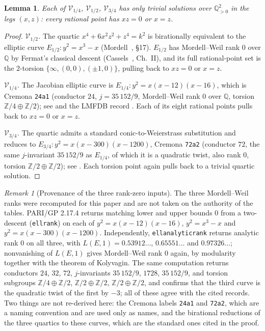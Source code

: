\documentclass[11pt,a4paper]{article}
\newcommand{\Z}{\mathbb{Z}}
\newcommand{\Q}{\mathbb{Q}}
\newtheorem{lemma}[theorem]{Lemma}
\theoremstyle{definition}
\theoremstyle{remark}
\newtheorem{remark}[theorem]{Remark}
\theoremstyle{plain}
\begin{document}
\begin{lemma}\label{lem:cremona-empty}
Each of $\mathcal{V}_{1/4}$, $\mathcal{V}_{1/2}$, $\mathcal{V}_{3/4}$ has only trivial solutions
over $\Q_{>0}^2$ in the legs $(x,z)$: every rational point has $xz=0$ or $x=z$.
\end{lemma}

\begin{proof}
\emph{$\mathcal{V}_{1/2}$.} The quartic $x^4+6x^2z^2+z^4=k^2$ is birationally equivalent to the
elliptic curve $E_{1/2}:y^2=x^3-x$ (Mordell~\cite{mordell-1969}, \S17). $E_{1/2}$ has
Mordell--Weil rank $0$ over $\Q$ by Fermat's classical descent (Cassels~\cite{cassels-1991},
Ch.~II), and its full rational-point set is the $2$-torsion $\{\infty,(0,0),(\pm1,0)\}$, pulling
back to $xz=0$ or $x=z$.

\emph{$\mathcal{V}_{1/4}$.} The Jacobian elliptic curve is $E_{1/4}:y^2=x(x-12)(x-16)$, which is
Cremona \texttt{24a1} (conductor $24$, $j=35\,152/9$, Mordell--Weil rank $0$ over $\Q$, torsion
$\Z/4\oplus\Z/2$); see \cite{cremona-1997} and the LMFDB record \cite{lmfdb-24a1}. Each of its
eight rational points pulls back to $xz=0$ or $x=z$.

\emph{$\mathcal{V}_{3/4}$.} The quartic admits a standard conic-to-Weierstrass substitution and
reduces to $E_{3/4}:y^2=x(x-300)(x-1200)$, Cremona \texttt{72a2} (conductor $72$, the same
$j$-invariant $35\,152/9$ as $E_{1/4}$, of which it is a quadratic twist, also rank $0$, torsion
$\Z/2\oplus\Z/2$); see \cite{cremona-1997,lmfdb-72a2}. Each torsion point again pulls back to a
trivial quartic solution.
\end{proof}

\begin{remark}[Provenance of the three rank-zero inputs]\label{rem:cremona-provenance}
The three Mordell--Weil ranks were recomputed for this paper and are not taken on the authority
of the tables. PARI/GP 2.17.4 returns matching lower and upper bounds $0$ from a two-descent
(\texttt{ellrank}) on each of $y^2=x(x-12)(x-16)$, $y^2=x^3-x$ and $y^2=x(x-300)(x-1200)$.
Independently, \texttt{ellanalyticrank} returns analytic rank $0$ on all three, with
$L(E,1)=0.53912\ldots$, $0.65551\ldots$ and $0.97326\ldots$; nonvanishing of $L(E,1)$ gives
Mordell--Weil rank $0$ again, by modularity together with the theorem of Kolyvagin. The same
computation returns conductors $24$, $32$, $72$, $j$-invariants $35\,152/9$, $1728$,
$35\,152/9$, and torsion subgroups $\Z/4\oplus\Z/2$, $\Z/2\oplus\Z/2$, $\Z/2\oplus\Z/2$, and
confirms that the third curve is the quadratic twist of the first by $-3$; all of these agree
with the cited records. Two things are not re-derived here: the Cremona labels
\texttt{24a1} and \texttt{72a2}, which are a naming convention and are used only as names, and
the birational reductions of the three quartics to these curves, which are the standard ones
cited in the proof.
\end{remark}
\end{document}
